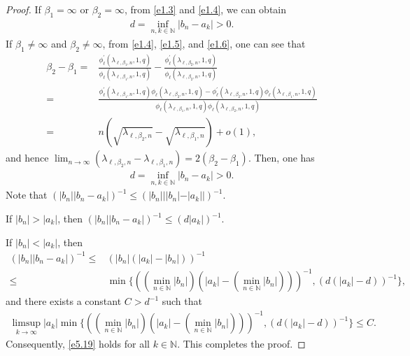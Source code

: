 \documentclass[reqno,12pt,centertags]{amsart}
\numberwithin{equation}{section}
\theoremstyle{definition}
\begin{document}
\begin{proof}
If $\beta_{1}=\infty$ or $\beta_{2}=\infty$, from \eqref{e1.3} and \eqref{e1.4}, we can obtain
\begin{align*}
d=\inf_{n,k\in\mathbb{N}}|b_{n}-a_{k}|>0.
\end{align*}
If $\beta_{1}\neq\infty$ and $\beta_{2}\neq\infty$, from \eqref{e1.4}, \eqref{e1.5}, and \eqref{e1.6}, one can see that
\begin{align*}
\beta_{2}-\beta_{1}
=&\frac{\phi_{\ell}^{\prime}(\lambda_{\ell,\beta_1,n},1,q)}
{\phi_{\ell}(\lambda_{\ell,\beta_1,n},1,q)}
-\frac{\phi_{\ell}^{\prime}(\lambda_{\ell,\beta_2,n},1,q)}
{\phi_{\ell}(\lambda_{\ell,\beta_2,n},1,q)}\\
=&\frac{\phi_{\ell}^{\prime}\left(\lambda_{\ell, \beta_1, n}, 1, q\right) \phi_{\ell}\left(\lambda_{\ell, \beta_2, n}, 1, q\right)-\phi_{\ell}^{\prime}\left(\lambda_{\ell, \beta_2, n}, 1, q\right) \phi_{\ell}\left(\lambda_{\ell, \beta_1, n}, 1, q\right)}
{\phi_{\ell}(\lambda_{\ell,\beta_1,n},1,q) \phi_{\ell}(\lambda_{\ell, \beta_2, n}, 1, q)}\\
=& n(\sqrt{\lambda_{\ell, \beta_2, n}}
-\sqrt{\lambda_{\ell, \beta_1, n}})+o(1),
\end{align*}
and hence
$\lim_{n\rightarrow\infty}(\lambda_{\ell, \beta_2, n}-\lambda_{\ell, \beta_1, n})= 2(\beta_2-\beta_1).$
Then, one has
\begin{align*}
d=\inf_{n,k\in\mathbb{N}}|b_{n}-a_{k}|>0.
\end{align*}
Note that
$(|b_{n}||b_{n}-a_{k}|)^{-1} \leq (|b_{n}|||b_{n}|-|a_{k}||)^{-1}$.

If $|b_{n}|>|a_{k}|$, then
$(|b_{n}||b_{n}-a_{k}|)^{-1} \leq (d|a_{k}|)^{-1}$.

If $|b_{n}|<|a_{k}|$, then
\begin{align*}
(|b_{n}||b_{n}-a_{k}|)^{-1}
\leq&(|b_{n}|(|a_{k}|-|b_{n}|))^{-1} \\
\leq& \min\{((\min_{n\in\mathbb{N}}|b_{n}|)(|a_{k}|-(\min_{n\in\mathbb{N}}|b_{n}|)))^{-1}, (d(|a_{k}|-d))^{-1}\},
\end{align*}
and there exists a constant $C>d^{-1}$ such that
\begin{align*}
\limsup_{k\rightarrow\infty}|a_{k}|\min\{((\min_{n\in\mathbb{N}}|b_{n}|)(|a_{k}|-(\min_{n\in\mathbb{N}}|b_{n}|)))^{-1}, (d(|a_{k}|-d))^{-1}\}\leq C.
\end{align*}
Consequently, \eqref{e5.19} holds for all $k\in\mathbb{N}$. This completes the proof. 
\end{proof}
\end{document}
